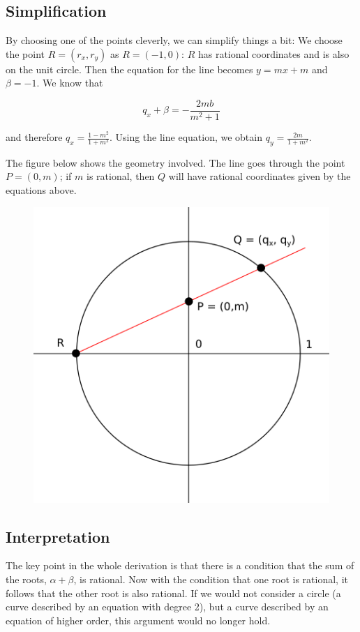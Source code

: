 \subsection{Simplification}

By choosing one of the points cleverly, we can simplify things a bit: We
choose the point \(R=(r_x, r_y)\) as \(R=(-1,0)\): \(R\) has rational
coordinates and is also on the unit circle. Then the equation for the
line becomes \(y = mx+m\) and \(\beta=-1\). We know that

\[
q_x + \beta = -\frac{2mb}{m^2 + 1}
\]

and therefore \(q_x = \frac{1-m^2}{1+m^2}\). Using the line equation, we
obtain \(q_y = \frac{2m}{1+m^2}\).

The figure below shows the geometry involved. The line goes through the
point \(P=(0,m)\); if \(m\) is rational, then \(Q\) will have rational
coordinates given by the equations above.

\begin{figure}
\centering
\includegraphics[scale=0.5]{images/rational_point_circle_01.png}
\end{figure}

\subsection{Interpretation}

The key point in the whole derivation is that there is a condition that
the sum of the roots, \(\alpha + \beta\), is rational. Now with the
condition that one root is rational, it follows that the other root is
also rational. If we would not consider a circle (a curve described by
an equation with degree 2), but a curve described by an equation of
higher order, this argument would no longer hold.
